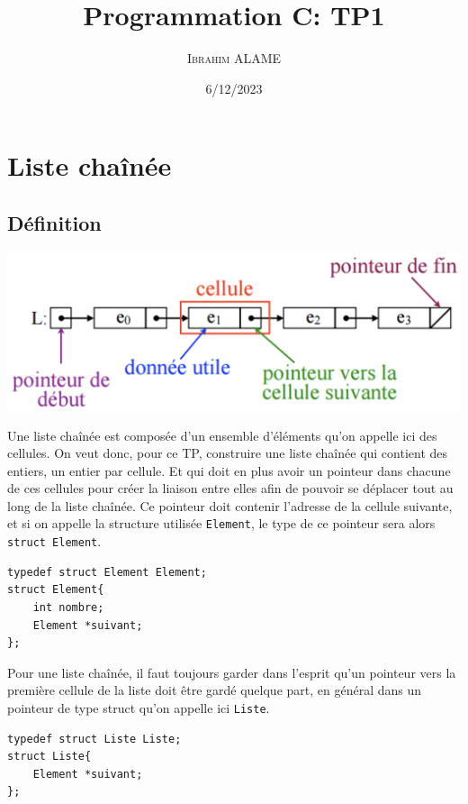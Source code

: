 \documentclass[a4paper]{article}
\title{Programmation C: TP1}
\author{ \textsc{Ibrahim ALAME}}
\date{6/12/2023}
\begin{document}
\maketitle

\section{Liste chaînée}
\subsection{Définition}
\begin{center}
\includegraphics[scale=0.25]{liste01.png} 
\end{center}  

  Une liste chaînée est composée d'un ensemble d'éléments qu'on appelle ici des cellules. On veut donc, pour ce TP, construire une liste chaînée qui contient des entiers, un entier par cellule. Et qui doit en plus avoir un pointeur dans chacune de ces cellules pour créer la liaison entre elles afin de pouvoir se déplacer tout au long de la liste chaînée. Ce pointeur doit contenir l'adresse de la cellule suivante, et si on appelle la structure utilisée {\tt Element}, le type de ce pointeur sera alors {\tt struct Element}.
\begin{verbatim}
typedef struct Element Element;
struct Element{
    int nombre;
    Element *suivant;
};
\end{verbatim}

Pour une liste chaînée, il faut toujours garder dans l'esprit qu'un pointeur vers la première cellule de la liste doit être gardé quelque part, en général dans un pointeur de type struct qu'on appelle ici {\tt Liste}.

\begin{verbatim}
typedef struct Liste Liste;
struct Liste{
    Element *suivant;
};
\end{verbatim}
\end{document}
